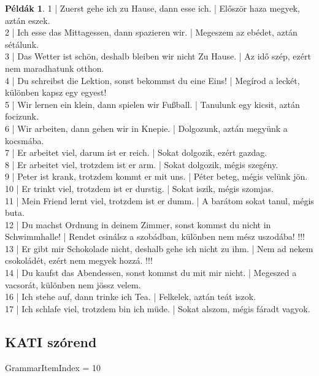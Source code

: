 \documentclass{article}
\theoremstyle{definition}
\newtheorem*{exmp}{Példák}
\begin{document}
\begin{exmp}
1 | Zuerst gehe ich zu Hause, dann esse ich. | Először haza megyek, aztán eszek.\\
2 | Ich esse das Mittagessen, dann spazieren wir. | Megeszem az ebédet, aztán sétálunk.\\
3 | Das Wetter ist schön, deshalb bleiben wir nicht Zu Hause. | Az idő szép, ezért nem maradhatunk otthon.\\
4 | Du schreibst die Lektion, sonst bekommst du eine Eins! | Megírod a leckét, különben kapsz egy egyest!\\
5 | Wir lernen ein klein, dann spielen wir Fußball. | Tanulunk egy kicsit, aztán focizunk.\\
6 | Wir arbeiten, dann gehen wir in Knepie. | Dolgozunk, aztán megyünk a kocsmába.\\
7 | Er arbeitet viel, darum ist er reich. | Sokat dolgozik, ezért gazdag.\\
8 | Er arbeitet viel, trotzdem ist er arm. | Sokat dolgozik, mégis szegény.\\
9 | Peter ist krank, trotzdem kommt er mit uns. | Péter beteg, mégis velünk jön.\\
10 | Er trinkt viel, trotzdem ist er durstig. | Sokat iszik, mégis szomjas.\\
11 | Mein Friend lernt viel, trotzdem ist er dumm. | A barátom sokat tanul, mégis buta.\\
12 | Du machst Ordnung in deinem Zimmer, sonst kommst du nicht in Schwimmhalle! | Rendet csinálsz a szobádban, különben nem mész uszodába! !!!\\
13 | Er gibt mir Schokolade nicht, deshalb gehe ich nicht zu ihm. | Nem ad nekem csokoládét, ezért nem megyek hozzá. !!!\\
14 | Du kaufst das Abendessen, sonst kommst du mit mir nicht. | Megeszed a vacsorát, különben nem jössz velem.\\
16 | Ich stehe auf, dann trinke ich Tea. | Felkelek, aztán teát iszok.\\
17 | Ich schlafe viel, trotzdem bin ich müde. | Sokat alszom, mégis fáradt vagyok.\\
\end{exmp}

\subsection{KATI szórend}

GrammarItemIndex = 10
\end{document}
